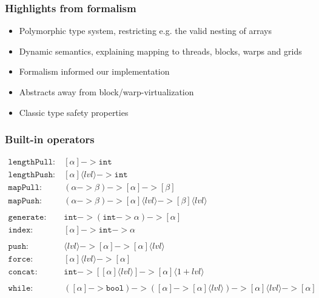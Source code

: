 \documentclass{beamer}
\newcommand{\kw}[1]{\texttt{#1}}
\newcommand{\lvl}[1]{\langle #1 \rangle}
\newcommand{\push}[2]{[ #1 ] \lvl{#2}}
\begin{document}
\begin{frame}
  \frametitle{Highlights from formalism}

  \begin{itemize}
  \item Polymorphic type system, restricting e.g. the valid nesting of arrays
  \item Dynamic semantics, explaining mapping to threads, blocks, warps and grids
  \item Formalism informed our implementation
  \item Abstracts away from block/warp-virtualization
  \item Classic type safety properties
  \end{itemize}

\end{frame}

\begin{frame}
  \frametitle{Built-in operators}

  \begin{align*}
      \kw{lengthPull} :~& [\alpha] -> \kw{int} \\
     \kw{lengthPush} :~& \push{\alpha}{lvl} -> \kw{int} \\
     \kw{mapPull} :~& (\alpha -> \beta) -> [\alpha] -> [\beta] \\
     \kw{mapPush} :~& (\alpha -> \beta) -> \push{\alpha}{lvl} -> \push{\beta}{lvl} \\
     \\
     \kw{generate} :~& \kw{int} -> (\kw{int} -> \alpha) -> [\alpha] \\
     \kw{index} :~& [\alpha] -> \kw{int} -> \alpha \\
     \\
     \kw{push} :~& \lvl{lvl} -> [\alpha] -> \push{\alpha}{lvl} \\
     \kw{force} :~& \push{\alpha}{lvl} -> [\alpha] \\
     \kw{concat} :~& \kw{int} -> [\push{\alpha}{lvl}] -> \push{\alpha}{1+lvl} \\
     \\
     \kw{while} :~& ([\alpha] -> \kw{bool}) -> ([\alpha] -> \push{\alpha}{lvl}) -> \push{\alpha}{lvl} -> [\alpha]
  \end{align*}
\end{frame}
\end{document}
